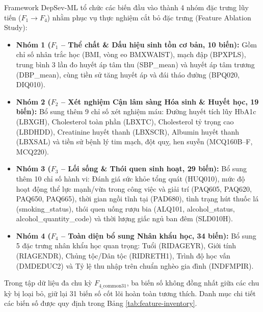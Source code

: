 Framework DepSev-ML tổ chức các biến đầu vào thành 4 nhóm đặc trưng lũy tiến ($F_1 \to F_4$) nhằm phục vụ thực nghiệm cắt bỏ đặc trưng (Feature Ablation Study):
\begin{itemize}
    \item \textbf{Nhóm 1 ($F_1$ -- Thể chất \& Dấu hiệu sinh tồn cơ bản, 10 biến):} Gồm chỉ số nhân trắc học (BMI, vòng eo BMXWAIST), mạch đập (BPXPLS), trung bình 3 lần đo huyết áp tâm thu (SBP\_mean) và huyết áp tâm trương (DBP\_mean), cùng tiền sử tăng huyết áp và đái tháo đường (BPQ020, DIQ010).
    \item \textbf{Nhóm 2 ($F_2$ -- Xét nghiệm Cận lâm sàng Hóa sinh \& Huyết học, 19 biến):} Bổ sung thêm 9 chỉ số xét nghiệm máu: Đường huyết tích lũy HbA1c (LBXGH), Cholesterol toàn phần (LBXTC), Cholesterol tỷ trọng cao (LBDHDD), Creatinine huyết thanh (LBXSCR), Albumin huyết thanh (LBXSAL) và tiền sử bệnh lý tim mạch, đột quỵ, hen suyễn (MCQ160B--F, MCQ220).
    \item \textbf{Nhóm 3 ($F_3$ -- Lối sống \& Thói quen sinh hoạt, 29 biến):} Bổ sung thêm 10 chỉ số hành vi: Đánh giá sức khỏe tổng quát (HUQ010), mức độ hoạt động thể lực mạnh/vừa trong công việc và giải trí (PAQ605, PAQ620, PAQ650, PAQ665), thời gian ngồi tĩnh tại (PAD680), tình trạng hút thuốc lá (smoking\_status), thói quen uống rượu bia (ALQ101, alcohol\_status, alcohol\_quantity\_code) và thời lượng giấc ngủ ban đêm (SLD010H).
    \item \textbf{Nhóm 4 ($F_4$ -- Toàn diện bổ sung Nhân khẩu học, 34 biến):} Bổ sung 5 đặc trưng nhân khẩu học quan trọng: Tuổi (RIDAGEYR), Giới tính (RIAGENDR), Chủng tộc/Dân tộc (RIDRETH1), Trình độ học vấn (DMDEDUC2) và Tỷ lệ thu nhập trên chuẩn nghèo gia đình (INDFMPIR).
\end{itemize}

Trong tập dữ liệu đa chu kỳ $F_{4\_\text{common31}}$, ba biến số không đồng nhất giữa các chu kỳ bị loại bỏ, giữ lại 31 biến số cốt lõi hoàn toàn tương thích. Danh mục chi tiết các biến số được quy định trong Bảng \ref{tab:feature-inventory}.

